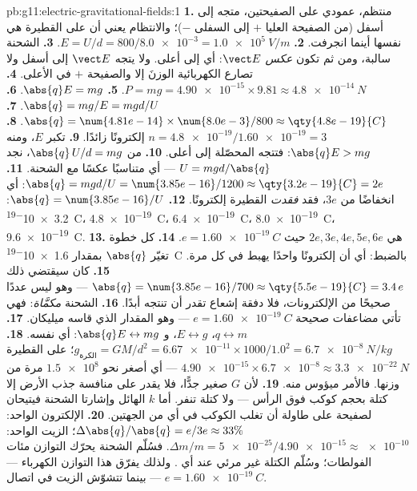 \begin{solution}{pb:g11:electric-gravitational-fields:1}
\textbf{1.} منتظم، عمودي على الصفيحتين، متجه إلى أسفل (من
الصفيحة العليا $+$ إلى السفلى $-$)؛ والانتظام يعني أن 
على القطيرة هي نفسها أينما انجرفت.
\textbf{2.} $E = U/d = 800 / \num{8.0e-3} = \qty{1.0e5}{V/m}$.
\textbf{3.} الشحنة سالبة، ومن ثم تكون  \emph{عكس}
$\vect E$: أي إلى أعلى. ولا يتجه $\vect E$ إلى أسفل ولا تصارع  الكهربائية الوزنَ
إلا والصفيحة $+$ في الأعلى.
\textbf{4.} $P = mg = \num{4.90e-15} \times 9.81 \approx
\qty{4.8e-14}{N}$.
\textbf{5.} $\abs{q}E = mg$.
\textbf{6.} $\abs{q} = mg/E = mgd/U$.
\textbf{7.} $\abs{q} = \num{4.81e-14} \times \num{8.0e-3} / 800
\approx \qty{4.8e-19}{C}$.
\textbf{8.} $n = \num{4.8e-19} / \num{1.60e-19} = 3$ إلكترونًا زائدًا.
\textbf{9.} تكبر $E$، ومنه $\abs{q}E > mg$: فتتجه  المحصّلة إلى أعلى.
\textbf{10.} من $\abs{q}\,U/d = mg$، نجد $U = mgd/\abs{q}$ --- أي متناسبًا
عكسًا مع الشحنة.
\textbf{11.} $\abs{q} = mgd/U = \num{3.85e-16}/1200 \approx
\qty{3.2e-19}{C} = 2e$: أي انخفاضًا من $3e$، فقد \emph{فقدت} القطيرة
إلكترونًا.
\textbf{12.} $\abs{q} = \num{3.85e-16}/U$: \qty{3.2e-19}{C}،
\qty{4.8e-19}{C}، \qty{6.4e-19}{C}، \qty{8.0e-19}{C}،
\qty{9.6e-19}{C}.
\textbf{13.} هي $2e, 3e, 4e, 5e, 6e$ حيث
$e = \qty{1.60e-19}{C}$.
\textbf{14.} كل خطوة تغيّر $\abs{q}$ بمقدار \qty{1.6e-19}{C}
بالضبط: أي أن إلكترونًا واحدًا يهبط في كل مرة.
\textbf{15.} كان سيقتضي ذلك $\abs{q} = \num{3.85e-16}/700 \approx
\qty{5.5e-19}{C} = 3.4\,e$ --- وهو ليس عددًا صحيحًا من الإلكترونات، فلا
دفقة إشعاع تقدر أن تنتجه أبدًا.
\textbf{16.} الشحنة \emph{مكمَّاة}: فهي تأتي مضاعفات صحيحة
 $e = \qty{1.60e-19}{C}$ --- وهو المقدار الذي
قاسه ميليكان.
\textbf{17.} $q \leftrightarrow m$، $E \leftrightarrow g$، و
$\abs{q}E \leftrightarrow mg$: أي  نفسه.
\textbf{18.} $g_{\text{الكرة}} = GM/d^2 = \num{6.67e-11} \times 1000 /
1.0^2 = \qty{6.7e-8}{N/kg}$؛  على القطيرة
$\num{4.90e-15} \times \num{6.7e-8} \approx \qty{3.3e-22}{N}$ --- أي أصغر نحو
$\num{1.5e8}$ مرة من وزنها. فالأمر ميؤوس منه.
\textbf{19.} لأن $G$ صغير جدًّا، فلا يقدر على منافسة جذب الأرض إلا كتلة
بحجم كوكب فوق الرأس --- ولا كتلة تنفر. أما $k$ الهائل
وإشارتا الشحنة فيتيحان لصفيحة على طاولة أن تغلب الكوكب
في أي من الجهتين.
\textbf{20.} الإلكترون الواحد: $\Delta\abs{q}/\abs{q} = e/3e \approx 33\%$؛
 الزيت الواحد: $\Delta m/m = \num{5e-25} / \num{4.90e-15}
\approx \num{e-10}$. فسُلّم الشحنة يحرّك  التوازن
مئات الفولطات؛ وسُلّم الكتلة غير مرئي عند أي .
ولذلك يفرّق هذا التوازن  الكهرباء ---
$e = \qty{1.60e-19}{C}$ --- بينما تتشوّش  الزيت في
اتصال.
\end{solution}
